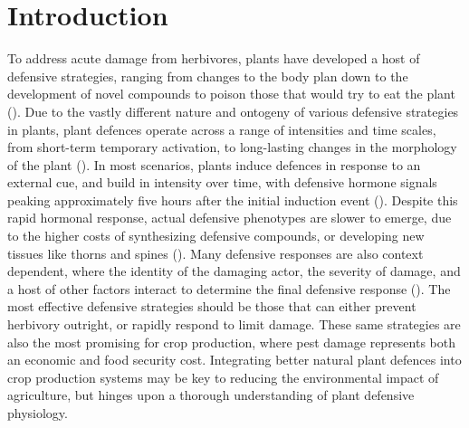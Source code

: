 \documentclass[12pt, letterpaper, ]{report}
\begin{document}
\section{Introduction}

To address acute damage from herbivores, plants have developed a host of defensive strategies, ranging from changes to the body plan down to the development of novel compounds to poison those that would try to eat the plant (\cite{agrawal_plant_2006}). Due to the vastly different nature and ontogeny of various defensive strategies in plants, plant defences operate across a range of intensities and time scales, from short-term temporary activation, to long-lasting changes in the morphology of the plant (\cite{agrawal_plant_2006, karban_induced_1989}). In most scenarios, plants induce defences in response to an external cue, and build in intensity over time, with defensive hormone signals peaking approximately five hours after the initial induction event (\cite{schmelz_quantitative_2003}). Despite this rapid hormonal response, actual defensive phenotypes are slower to emerge, due to the higher costs of synthesizing defensive compounds, or developing new tissues like thorns and spines (\cite{karban_induced_1989}). Many defensive responses are also context dependent, where the identity of the damaging actor, the severity of damage, and a host of other factors interact to determine the final defensive response (\cite{waterman_simulated_2019}). The most effective defensive strategies should be those that can either prevent herbivory outright, or rapidly respond to limit damage. These same strategies are also the most promising for crop production, where pest damage represents both an economic and food security cost. Integrating better natural plant defences into crop production systems may be key to reducing the environmental impact of agriculture, but hinges upon a thorough understanding of plant defensive physiology.
\end{document}
